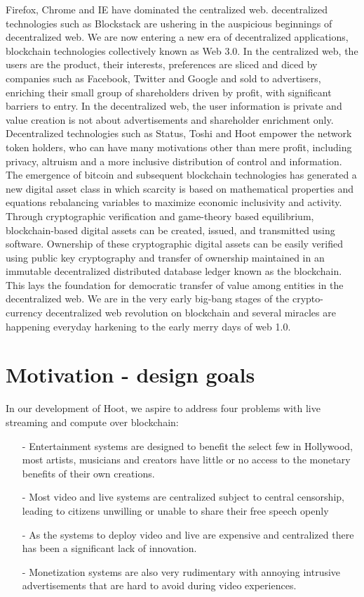 \documentclass{article}
\begin{document}
 Firefox, Chrome and IE have dominated the centralized web. decentralized technologies
such as Blockstack are ushering in the auspicious beginnings of decentralized web. 
 We are now entering a new era of decentralized applications, blockchain technologies collectively known as Web 3.0. In the centralized web, the users are the product, their interests, preferences are sliced and diced by companies such as Facebook, Twitter and Google and sold to advertisers, enriching their
small group of shareholders driven by profit, with significant barriers to entry. In the
decentralized web, the user information is private and value creation is not about advertisements and shareholder enrichment only. Decentralized
technologies such as Status, Toshi and Hoot empower the network token holders, who can have many motivations other than mere profit, including privacy, altruism and a more inclusive distribution of control and information. The emergence of bitcoin and subsequent blockchain technologies has generated a new digital asset class in which scarcity is based on mathematical properties and equations rebalancing variables to maximize economic inclusivity and activity. Through cryptographic verification and game-theory based equilibrium, blockchain-based digital assets can be created, issued, and transmitted using software. Ownership of these cryptographic digital assets can be easily verified using public key cryptography and transfer of ownership maintained in an immutable decentralized distributed database ledger known as the blockchain. This lays the foundation for democratic transfer of value among entities in the decentralized web.
 We are in the very early big-bang stages of the crypto-currency decentralized web revolution on blockchain and several miracles are happening everyday harkening to the early merry days of web 1.0.

\section{Motivation - design goals}
In our development of Hoot, we aspire to address four problems with live streaming and compute over blockchain:
\begin{itemize}
\item[-]Entertainment systems are designed to benefit the select few  in Hollywood, most artists, musicians and creators have little or no access to the monetary  benefits of their own creations.
\item[-]Most video and live systems are centralized subject to  central censorship, leading to citizens unwilling or unable to  share their free speech openly
\item[-]As the systems to deploy video and live are expensive and  centralized there has been a significant lack of innovation.
\item[-]Monetization systems are also very rudimentary with annoying  intrusive advertisements that are hard to avoid during video  experiences. 
\end{itemize}
\end{document}
